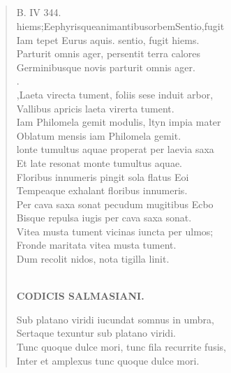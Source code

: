 \documentclass[11pt, a4paper]{report}
\begin{document}
            \subsection*{}
      \begin{verse}
      B. IV 344. \\ hiems;EephyrisqueanimantibusorbemSentio,fugit \\ Iam tepet Eurus aquis. sentio, fugit hiems. \\ Parturit omnis ager, persentit terra calores \\ Germinibusque novis parturit omnis ager. \\ . \\ ,Laeta virecta tument, foliis sese induit arbor, \\ Vallibus apricis laeta virerta tument. \\ Iam Philomela gemit modulis, ltyn impia mater \\ Oblatum mensis iam Philomela gemit. \\ lonte tumultus aquae properat per laevia saxa \\ Et late resonat monte tumultus aquae. \\ Floribus innumeris pingit sola flatus Eoi \\ Tempeaque exhalant floribus innumeris. \\ Per cava saxa sonat pecudum mugitibus Ecbo \\ Bisque repulsa iugis per cava saxa sonat. \\ Vitea musta tument vicinas iuncta per ulmos; \\ Fronde maritata vitea musta tument. \\ Dum recolit nidos, nota tigilla linit. \\ 
        ﻿\pagebreak 
    \begin{center} \textbf{CODICIS SALMASIANI.} \end{center} \marginpar{[195]} Sub platano viridi iucundat somnus in umbra, \\ Sertaque texuntur sub platano viridi. \\ Tunc quoque dulce mori, tunc fila recurrite fusis, \\ Inter et amplexus tunc quoque dulce mori. \\ 
      \end{verse}
  
\end{document}
